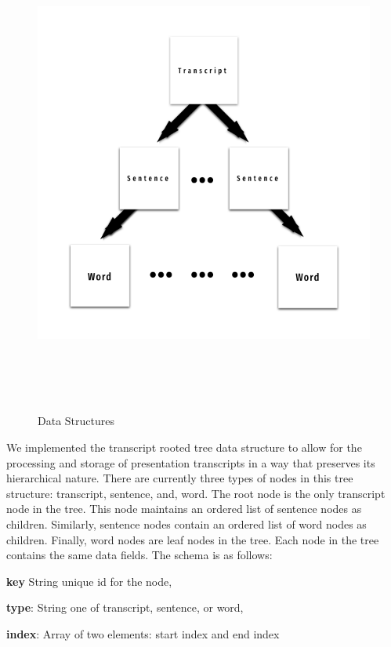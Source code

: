 \begin{figure}[H]
  \centering
   \includegraphics[height=6.3in]{figures/transcript}
   \caption{Data Structures}
\end{figure}

We implemented the transcript rooted tree data structure to allow for the
processing and storage of presentation transcripts in a way that preserves its
hierarchical nature. There are currently three types of nodes in this tree
structure: transcript, sentence, and, word. The root node is the only transcript
node in the tree. This node maintains an ordered list of sentence nodes as
children. Similarly, sentence nodes contain an ordered list of word nodes as
children. Finally, word nodes are leaf nodes in the tree. Each node in the tree
contains the same data fields. The schema is as follows:

\textbf{key} String unique id for the node,

\textbf{type}: String one of transcript, sentence, or word,

\textbf{index}: Array of two elements: start index and end index

